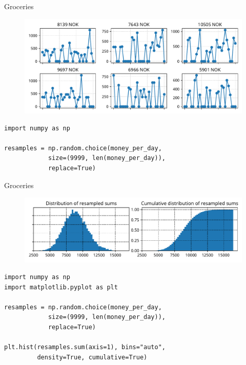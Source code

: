 \documentclass[12pt, aspectratio=149]{beamer}
\theoremstyle{plain}
\begin{document}
\begin{frame}[fragile]{Groceries}
\begin{center}
 \begin{figure}
    	\centering
    	\includegraphics[width=0.99\linewidth]{figures/groceries_data_resamples}
 \end{figure}
 \end{center}

\begin{center}
\begin{verbatim} 
import numpy as np

resamples = np.random.choice(money_per_day, 
            size=(9999, len(money_per_day)), 
            replace=True)
\end{verbatim}
\end{center}
     
\end{frame}

\begin{frame}[fragile]{Groceries}
\begin{center}
 \begin{figure}
    	\centering
    	\includegraphics[width=0.99\linewidth]{figures/groceries_data_resampled}
 \end{figure}
 \end{center}

\begin{center}
\begin{verbatim} 
import numpy as np
import matplotlib.pyplot as plt

resamples = np.random.choice(money_per_day, 
            size=(9999, len(money_per_day)), 
            replace=True)

plt.hist(resamples.sum(axis=1), bins="auto", 
         density=True, cumulative=True)
\end{verbatim}
\end{center}
     
\end{frame}
\end{document}
